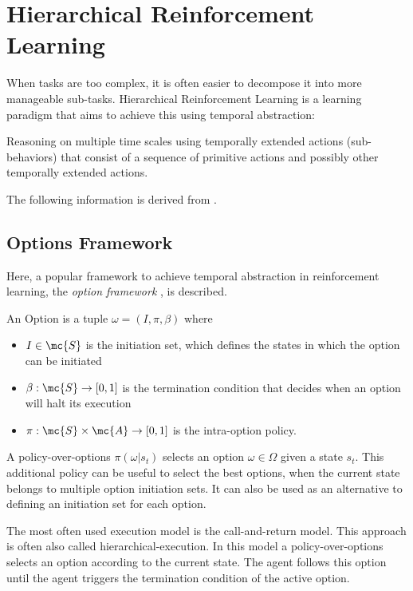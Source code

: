 \section{Hierarchical Reinforcement Learning}
When tasks are too complex, it is often easier to decompose it into more manageable sub-tasks. Hierarchical Reinforcement Learning
is a learning paradigm that aims to achieve this using temporal abstraction:

Reasoning on multiple time scales using temporally extended actions (sub-behaviors) that consist of a sequence of primitive actions
and possibly other temporally extended actions.

The following information is derived from \cite{survey_mdpi}.

\subsection{Options Framework}
Here, a popular framework to achieve temporal abstraction in reinforcement learning, the \textit{option framework} \cite{Options}, is described.

\begin{definition}
    An Option is a tuple $\omega = (I, \pi, \beta)$ where
    \begin{itemize}
        \item $I \in \mc{S}$ is the initiation set, which defines the states in which the option can be initiated
        \item $\beta: \mc{S} \rightarrow [0, 1]$ is the termination condition that decides when an option will halt its execution
        \item $\pi: \mc{S} \times \mc{A} \rightarrow [0,1]$ is the intra-option policy.
    \end{itemize}
\end{definition}

A policy-over-options $\pi(\omega|s_t)$ selects an option $\omega \in \Omega$ given a state $s_t$. This additional policy can be useful
to select the best options, when the current state belongs to multiple option initiation sets. It can also be used as an alternative to defining
an initiation set for each option.

The most often used execution model is the call-and-return model. This approach is often also called hierarchical-execution.
In this model a policy-over-options selects an option according to the current state. The agent follows this option until the 
agent triggers the termination condition of the active option.

